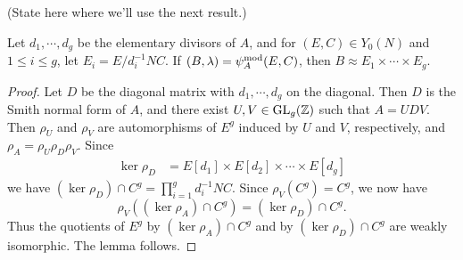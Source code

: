 \documentclass{amsart}
\begin{document}
%



(State here where we'll use the next result.)
\begin{lemma}\label{lem:psimod-weakly-isomorphic-to-product}
  Let $d_1, \cdots, d_g$ be the elementary divisors of $A$, and for $(E,C) \in Y_0(N)$ and $1 \le i \le g$, let $E_i = E/d_i^{-1}NC$. If $(B,\lambda) = \psi_{A}^\mathrm{mod}(E,C)$, then
$
    B \approx E_1 \times \cdots \times E_g.
$
\end{lemma}

\begin{proof}
  Let $D$ be the diagonal matrix with $d_1, \cdots, d_g$ on the diagonal.
Then $D$ is the Smith normal form of $A$, and there exist $U,V \in \operatorname{GL}_g(\mathbb{Z})$ such that $A = UDV$. Then $\rho_U$ and $\rho_V$ are automorphisms of $E^g$ induced by $U$ and $V$, respectively, and $\rho_A = \rho_U \rho_D \rho_V$. Since
  \begin{align*}
    \ker \rho_D &= E[d_1] \times E[d_2] \times \cdots \times E[d_g]
  \end{align*}
  we have $(\ker \rho_D) \cap C^g = \prod_{i=1}^g d_i^{-1}NC$. %
 Since $\rho_V(C^g) = C^g$, we now have
  \[
    \rho_V((\ker \rho_A) \cap C^g) = (\ker \rho_D) \cap C^g.
  \]
  Thus the quotients of $E^g$ by $(\ker \rho_A) \cap C^g$ and by $(\ker \rho_D) \cap C^g$ are weakly isomorphic. The lemma follows.
\end{proof}
\end{document}
